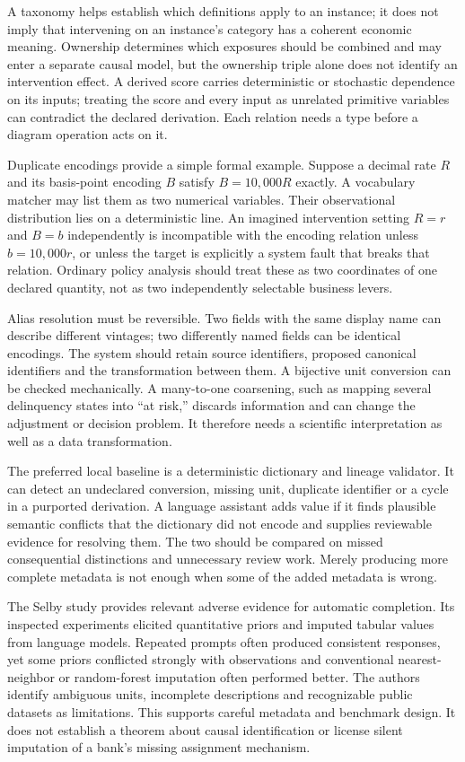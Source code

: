 A taxonomy helps establish which definitions apply to an instance; it
does not imply that intervening on an instance's category has a coherent
economic meaning. Ownership determines which exposures should be
combined and may enter a separate causal model, but the ownership triple
alone does not identify an intervention effect. A derived score carries
deterministic or stochastic dependence on its inputs; treating the score
and every input as unrelated primitive variables can contradict the
declared derivation. Each relation needs a type before a diagram
operation acts on it.

Duplicate encodings provide a simple formal example. Suppose a decimal
rate \(R\) and its basis-point encoding \(B\) satisfy \(B=10{,}000R\)
exactly. A vocabulary matcher may list them as two numerical variables.
Their observational distribution lies on a deterministic line. An
imagined intervention setting \(R=r\) and \(B=b\) independently is
incompatible with the encoding relation unless \(b=10{,}000r\), or
unless the target is explicitly a system fault that breaks that
relation. Ordinary policy analysis should treat these as two coordinates
of one declared quantity, not as two independently selectable business
levers.

Alias resolution must be reversible. Two fields with the same display
name can describe different vintages; two differently named fields can
be identical encodings. The system should retain source identifiers,
proposed canonical identifiers and the transformation between them. A
bijective unit conversion can be checked mechanically. A many-to-one
coarsening, such as mapping several delinquency states into ``at risk,''
discards information and can change the adjustment or decision problem.
It therefore needs a scientific interpretation as well as a data
transformation.

The preferred local baseline is a deterministic dictionary and lineage
validator. It can detect an undeclared conversion, missing unit,
duplicate identifier or a cycle in a purported derivation. A language
assistant adds value if it finds plausible semantic conflicts that the
dictionary did not encode and supplies reviewable evidence for resolving
them. The two should be compared on missed consequential distinctions
and unnecessary review work. Merely producing more complete metadata is
not enough when some of the added metadata is wrong.

The Selby study provides relevant adverse evidence for automatic
completion. Its inspected experiments elicited quantitative priors and
imputed tabular values from language models. Repeated prompts often
produced consistent responses, yet some priors conflicted strongly with
observations and conventional nearest-neighbor or random-forest
imputation often performed better. The authors identify ambiguous units,
incomplete descriptions and recognizable public datasets as limitations.
This supports careful metadata and benchmark design. It does not
establish a theorem about causal identification or license silent
imputation of a bank's missing assignment mechanism.
\citep{v12_la_2402_07770}

